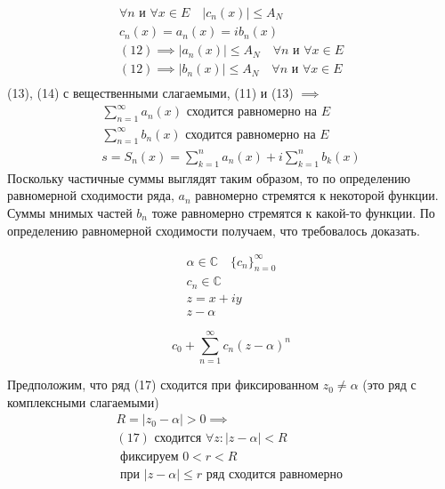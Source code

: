 \documentclass[main]{subfiles}
\begin{document}
\begin{longProof}
    \begin{gather*}
        \forall n \text{ и } \forall x \in E \quad |c_n(x)| \leq A_N \tag{12} \\
        c_n(x) = a_n(x) = ib_n(x) \\
        (12) \implies |a_n(x) | \leq A_N \quad \forall n \text{ и } \forall x \in E \tag{13}\\
        (12) \implies |b_n(x) | \leq A_N \quad \forall n \text{ и } \forall x \in E \tag{14}\\
    \end{gather*}
    (13), (14) с вещественными слагаемыми, (11) и (13) $\implies$
    \begin{gather*}
        \sum^\infty_{n=1} a_n(x) \text{ сходится равномерно на } E \tag{15}\\
        \sum^\infty_{n=1} b_n(x) \text{ сходится равномерно на } E \tag{16}\\
        s=S_n(x) = \sum^n_{k=1} a_n(x) + i \sum^n_{k=1} b_k(x)
    \end{gather*}
    Поскольку частичные суммы выглядят таким образом, то по определению равномерной сходимости ряда, $a_n$
    равномерно стремятся к некоторой функции. Суммы мнимых частей $b_n$ тоже равномерно стремятся к какой-то функции.
    По определению равномерной сходимости получаем, что требовалось доказать.
\end{longProof} 
\begin{gather*}
    \alpha \in \mathbb{C} \quad \{ c_n \} ^\infty_{n=0} \\
    c_n \in \mathbb{C} \\
    z = x + iy \\
    z - \alpha
\end{gather*}
\begin{definition}
    \[ c_0 + \sum^\infty_{n=1} c_n(z-\alpha)^n \tag{17} \]
\end{definition}
\begin{lemma}[Абеля]
    Предположим, что ряд (17) сходится при фиксированном $z_0 \ne \alpha$ (это ряд с комплексными 
    слагаемыми)
    \begin{gather*}
        R = |z_0 - \alpha| > 0 \implies \\
        (17) \text { сходится }\forall z : |z-\alpha| < R \tag{18}\\
        \text{ фиксируем } 0 < r < R  \\
        \text{ при } |z-\alpha| \leq r \text{ ряд сходится равномерно } \tag{19}
    \end{gather*} 
\end{lemma}
\end{document}
